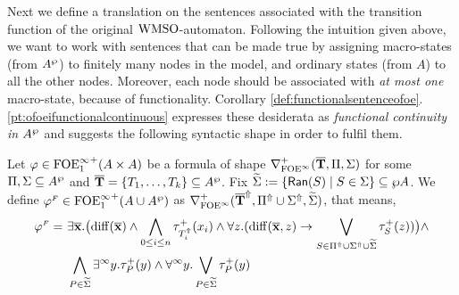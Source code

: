 Next we define a translation on the sentences associated with the
transition function of the original $\mathrm{WMSO}$-automaton. Following the intuition given above, we want to work with sentences that can be made true by assigning macro-states (from $A^{\wp}$) to finitely many nodes in the model, and ordinary states (from $A$) to all the other nodes. Moreover, each node should be associated with \emph{at most one} macro-state, because of functionality. Corollary \ref{def:functionalsentenceofoe}.\ref{pt:ofoeifunctionalcontinuous} expresses these desiderata as \emph{functional continuity in $A^{\wp}$} and suggests the following syntactic shape in order to fulfil them.

\begin{definition}\label{DEF_finitary_lifting}
Let $\varphi \in {\ensuremath{\mathrm{FOE}^{\infty}_1}}^+(A \times A)$ be a formula of shape $\nabla^+_{\mathrm{FOE}^{\infty}}(\overline{{\mathbf{T}}},\Pi,\Sigma)$ for some $\Pi,\Sigma \subseteq A^{\wp}$ and $\overline{{\mathbf{T}}} = \{T_1,\dots,T_k\} \subseteq A^{\wp}$. Fix $\widetilde{\Sigma} \mathrel{: =} \{\mathsf{Ran}(S) \mid S \in \Sigma\} \subseteq \wp A$. We define $\varphi^{{\scriptscriptstyle F}} \in {\ensuremath{\mathrm{FOE}^{\infty}_1}}^+(A \cup A^{\wp})$ as $\nabla^+_{\mathrm{FOE}^{\infty}}(\overline{{\mathbf{T}}}^{\Uparrow},\Pi^{\Uparrow} \cup \Sigma^{\Uparrow},\widetilde{\Sigma})$, that means,
\begin{equation}\label{eq:unfoldingNablaolque}
\begin{aligned}
\varphi^{\fin} =\ &
    \exists \vlist{x}.\big(\arediff{\vlist{x}} \land \bigwedge_{0 \leq i \leq n} \tau^+_{\lift{T}_i}(x_i)
\land
    \forall z.(\arediff{\vlist{x},z} \lthen \bigvee_{S\in \lift{\Pi} \cup \lift{\Sigma} \cup \widetilde{\Sigma}} \tau^+_S(z))\big)
\land
\\ & 
    \bigwedge_{P\in\widetilde{\Sigma}} \qu y.{\tau}^{+}_P(y)
 \land
    \dqu y.\bigvee_{P\in\widetilde{\Sigma}} {\tau}^{+}_P(y)
    \end{aligned}
\end{equation}
\end{definition}


